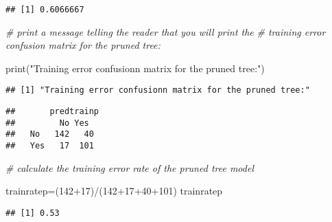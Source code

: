 \documentclass[
]{article}
\newenvironment{Shaded}{\begin{snugshade}}{\end{snugshade}}
\newcommand{\CommentTok}[1]{\textcolor[rgb]{0.56,0.35,0.01}{\textit{#1}}}
\newcommand{\DecValTok}[1]{\textcolor[rgb]{0.00,0.00,0.81}{#1}}
\newcommand{\FunctionTok}[1]{\textcolor[rgb]{0.00,0.00,0.00}{#1}}
\newcommand{\NormalTok}[1]{#1}
\newcommand{\OtherTok}[1]{\textcolor[rgb]{0.56,0.35,0.01}{#1}}
\newcommand{\SpecialCharTok}[1]{\textcolor[rgb]{0.00,0.00,0.00}{#1}}
\newcommand{\StringTok}[1]{\textcolor[rgb]{0.31,0.60,0.02}{#1}}
\begin{document}
\begin{verbatim}
## [1] 0.6066667
\end{verbatim}

\begin{Shaded}
\begin{Highlighting}[]
\CommentTok{\# print a message telling the reader that you will print the}
\CommentTok{\# training error confusion matrix for the pruned tree:}

\FunctionTok{print}\NormalTok{(}\StringTok{"Training error confusionn matrix for the pruned tree:"}\NormalTok{)}
\end{Highlighting}
\end{Shaded}

\begin{verbatim}
## [1] "Training error confusionn matrix for the pruned tree:"
\end{verbatim}

\begin{Shaded}
\end{Shaded}

\begin{verbatim}
##       predtrainp
##         No Yes 
##   No   142   40
##   Yes   17  101
\end{verbatim}

\begin{Shaded}
\begin{Highlighting}[]
\CommentTok{\# calculate the training error rate of the  pruned tree model}

\NormalTok{trainratep}\OtherTok{=}\NormalTok{(}\DecValTok{142}\SpecialCharTok{+}\DecValTok{17}\NormalTok{)}\SpecialCharTok{/}\NormalTok{(}\DecValTok{142}\SpecialCharTok{+}\DecValTok{17}\SpecialCharTok{+}\DecValTok{40}\SpecialCharTok{+}\DecValTok{101}\NormalTok{)}
\NormalTok{trainratep}
\end{Highlighting}
\end{Shaded}

\begin{verbatim}
## [1] 0.53
\end{verbatim}
\end{document}
